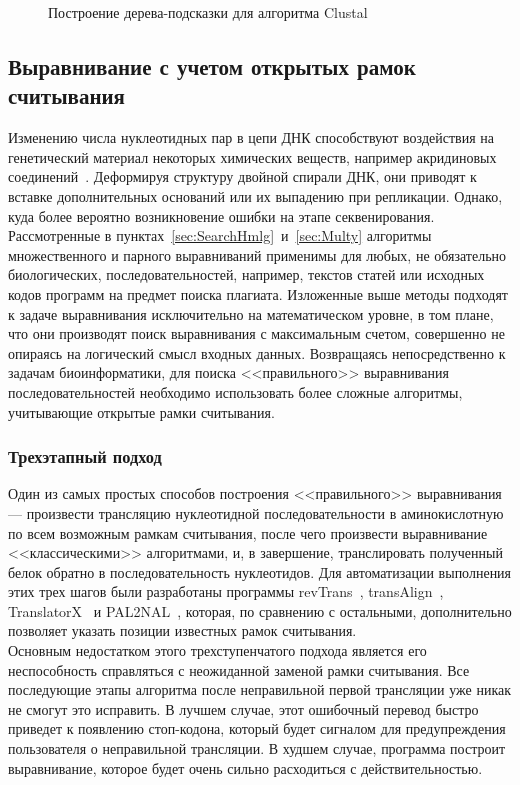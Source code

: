 \begin{figure}[h]
	\caption{Построение дерева-подсказки для алгоритма Clustal}
	\label{ris:Clustal}
\end{figure}

\subsection[Выравнивание с учетом открытых рамок считывания]{\large Выравнивание с учетом открытых рамок считывания}
\hspace{\parindent} Изменению числа нуклеотидных пар в цепи ДНК способствуют воздействия на генетический материал некоторых химических веществ, например акридиновых соединений~\cite{BioBook}. Деформируя структуру двойной спирали ДНК, они приводят к вставке дополнительных оснований или их выпадению при репликации. Однако, куда более вероятно возникновение ошибки на этапе секвенирования.\\
\indent Рассмотренные в пунктах~\ref{sec:SearchHmlg}~и~\ref{sec:Multy} алгоритмы множественного и парного выравниваний применимы для любых, не обязательно биологических, последовательностей, например, текстов статей или исходных кодов программ на предмет поиска плагиата. Изложенные выше методы подходят к задаче выравнивания исключительно на математическом уровне, в том плане, что они производят поиск выравнивания с максимальным счетом, совершенно не опираясь на логический смысл входных данных. Возвращаясь непосредственно к задачам биоинформатики, для поиска <<правильного>> выравнивания последовательностей необходимо использовать более сложные алгоритмы, учитывающие открытые рамки считывания.

\subsubsection[Трехэтапный подход]{\large Трехэтапный подход}
\hspace{\parindent} Один из самых простых способов построения <<правильного>> выравнивания --- произвести трансляцию нуклеотидной последовательности в аминокислотную по всем возможным рамкам считывания, после чего произвести выравнивание <<классическими>> алгоритмами, и, в завершение, транслировать полученный белок обратно в последовательность нуклеотидов. Для автоматизации выполнения этих трех шагов были разработаны программы revTrans~\cite{RevTrans}, transAlign~\cite{transAlign}, TranslatorX~\cite{TranslatorX} и PAL2NAL~\cite{PAL2NAL}, которая, по сравнению с остальными, дополнительно позволяет указать позиции известных рамок считывания. \\
\indent Основным недостатком этого трехступенчатого подхода является его неспособность справляться с неожиданной заменой рамки считывания. Все последующие этапы алгоритма после неправильной первой трансляции уже никак не смогут это исправить. В лучшем случае, этот ошибочный перевод быстро приведет к появлению стоп-кодона, который будет сигналом для предупреждения пользователя о неправильной трансляции. В худшем случае, программа построит выравнивание, которое будет очень сильно расходиться с действительностью.

